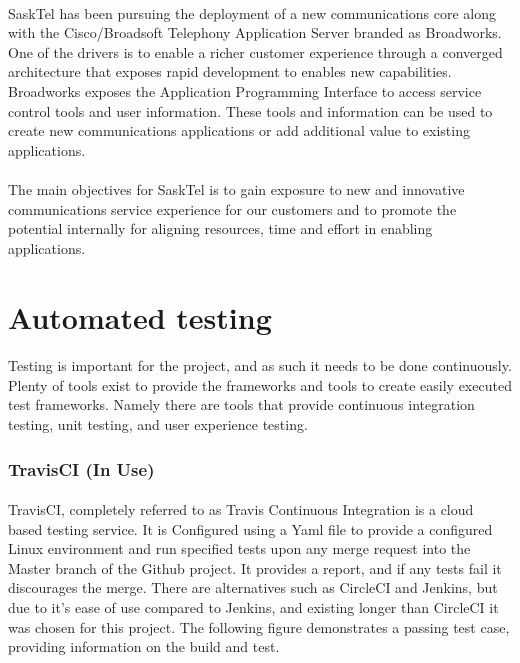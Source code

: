 \documentclass[12pt]{article}
\begin{document}
\paragraph{} 
	SaskTel has been pursuing the deployment of a new communications core along with the Cisco/Broadsoft Telephony Application Server branded as Broadworks.  One of the drivers is to enable a richer customer experience through a converged architecture that exposes rapid development to enables new capabilities.  Broadworks exposes the Application Programming Interface to access service control tools and user information.  These tools and information can be used to create new communications applications or add additional value to existing applications.  
\paragraph{} 
	The main objectives for SaskTel is to gain exposure to new and innovative communications service experience for our customers and to promote the potential internally for aligning resources, time and effort in enabling applications.

\section{Automated testing}
\paragraph{}	Testing is important for the project, and as such it needs to be done continuously. Plenty of tools exist to provide the frameworks and tools to create easily executed test frameworks. Namely there are tools that provide continuous integration testing, unit testing, and user experience testing. 

\subsubsection{TravisCI (In Use)}
\paragraph{}	TravisCI, completely referred to as Travis Continuous Integration is a cloud based testing service. It is Configured using a Yaml file to provide a configured Linux environment and run specified tests upon any merge request into the Master branch of the Github project. It provides a report, and if any tests fail it discourages the merge. There are alternatives such as CircleCI and Jenkins, but due to it's ease of use compared to Jenkins, and existing longer than CircleCI it was chosen for this project. The following figure demonstrates a passing test case, providing information on the build and test.\\
\end{document}
